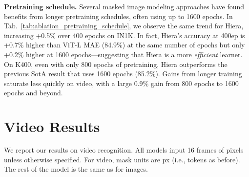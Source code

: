 \documentclass[nohyperref]{article}
\renewcommand{\paragraph}[1]{\vspace{1.25mm}\noindent\textbf{#1}}
\newcommand{\shortname}{{Hiera}}
\theoremstyle{plain}
\theoremstyle{definition}
\theoremstyle{remark}
\begin{document}
\paragraph{Pretraining schedule.}
Several masked image modeling approaches \cite{mae,maskfeat} have found benefits from longer pretraining schedules, often using up to 1600 epochs. In Tab.~\ref{tab:ablation_pretraining_schedule}, we observe the same trend for \shortname{}, increasing +0.5\% over 400 epochs on IN1K. In fact, \shortname{}'s accuracy at 400ep is +0.7\% higher than ViT-L MAE (84.9\%) at the same number of epochs but only +0.2\% higher at 1600 epochs---suggesting that \shortname{} is a more \textit{efficient} learner. On K400, even with only 800 epochs of pretraining, \shortname{} outperforms the previous SotA result that uses 1600 epochs (85.2\%). Gains from longer training saturate less quickly on video, with a large 0.9\% gain from 800 epochs to 1600 epochs and beyond.



\section{Video Results} \label{sec:video_experiments}
We report our results on video recognition. All models input 16 frames of  pixels unless otherwise specified. For video, mask units are  px (i.e.,  tokens as before). The rest of the model is the same as for images.
\end{document}
